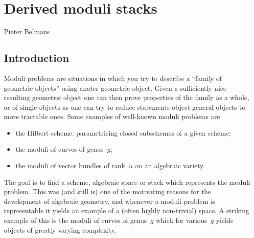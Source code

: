 \chapter{Derived moduli stacks}
\begin{flushright}
  Pieter Belmans
\end{flushright}

\begin{refsection}

\section{Introduction}
Moduli problems are situations in which you try to describe a ``family of geometric objects'' using anoter geometric object. Given a sufficiently nice resulting geometric object one can then prove properties of the family as a whole, or of single objects as one can try to reduce statements object general objects to more tractable ones. Some examples of well-known moduli problems are
\begin{itemize}
  \item the Hilbert scheme: parametrising closed subschemes of a given scheme;
  \item the moduli of curves of genus~$g$;
  \item the moduli of vector bundles of rank~$n$ on an algebraic variety.
\end{itemize}
The goal is to find a scheme, algebraic space or stack which represents the moduli problem. This was (and still is) one of the motivating reasons for the development of algebraic geometry, and whenever a moduli problem is representable it yields an example of a (often highly non-trivial) space. A striking example of this is the moduli of curves of genus~$g$ which for various~$g$ yields objects of greatly varying complexity.


\end{refsection}

